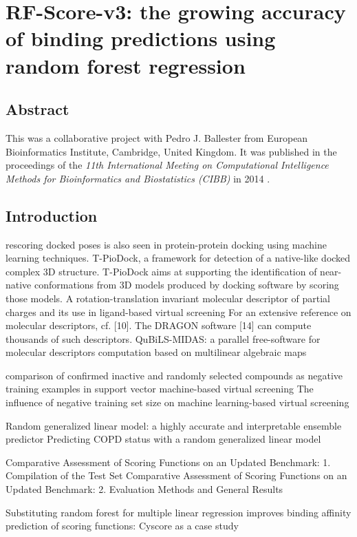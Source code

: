 \chapter{RF-Score-v3: the growing accuracy of binding predictions using random forest regression}

\section{Abstract}

This was a collaborative project with Pedro J. Ballester from European Bioinformatics Institute, Cambridge, United Kingdom. It was published in the proceedings of the \textit{11th International Meeting on Computational Intelligence Methods for Bioinformatics and Biostatistics (CIBB)} in 2014 \citep{1433}.

\section{Introduction}

\citep{1399} rescoring docked poses is also seen in protein-protein docking using machine learning techniques. T-PioDock, a framework for detection of a native-like docked complex 3D structure. T-PioDock aims at supporting the identification of near-native conformations from 3D models produced by docking software by scoring those models.
\citep{1389} A rotation-translation invariant molecular descriptor of partial charges and its use in ligand-based virtual screening
\citep{1389} For an extensive reference on molecular descriptors, cf. [10]. The DRAGON software [14] can compute thousands of such descriptors.
\citep{1400} QuBiLS-MIDAS: a parallel free-software for molecular descriptors computation based on multilinear algebraic maps

\citep{1423} comparison of confirmed inactive and randomly selected compounds as negative training examples in support vector machine-based virtual screening
\citep{1404} The influence of negative training set size on machine learning-based virtual screening

\citep{1377} Random generalized linear model: a highly accurate and interpretable ensemble predictor
\citep{1418} Predicting COPD status with a random generalized linear model

\citep{1426} Comparative Assessment of Scoring Functions on an Updated Benchmark: 1. Compilation of the Test Set
\citep{1411} Comparative Assessment of Scoring Functions on an Updated Benchmark: 2. Evaluation Methods and General Results

\citep{1432} Substituting random forest for multiple linear regression improves binding affinity prediction of scoring functions: Cyscore as a case study

\chapterend
